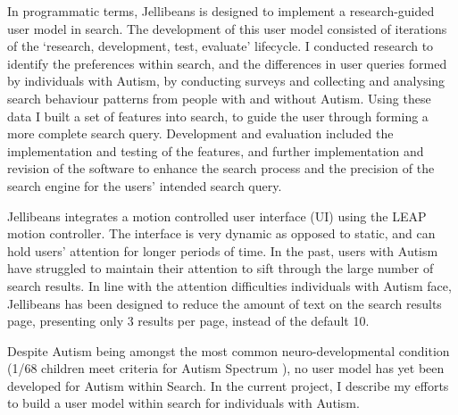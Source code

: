 \documentclass[a4paper, 11pt]{article}
\begin{document}
In programmatic terms, Jellibeans is designed to implement a research-guided user model in search. The development of this user model consisted of iterations of the `research, development, test, evaluate' lifecycle. I conducted research to identify the preferences within search, and the differences in user queries formed by individuals with Autism, by conducting surveys and collecting and analysing search behaviour patterns from people with and without Autism. Using these data I built a set of features into search, to guide the user through forming a more complete search query. Development and evaluation included the implementation and testing of the features, and further implementation and revision of the software to enhance the search process and the precision of the search engine for the users' intended search query. 
\vspace{5mm}

Jellibeans integrates a motion controlled user interface (UI) using the LEAP motion controller. The interface is very dynamic as opposed to static, and can hold users' attention for longer periods of time. In the past, users with Autism have struggled to maintain their attention to sift through the large number of search results. In line with the attention difficulties individuals with Autism face, Jellibeans has been designed to reduce the amount of text on the search results page, presenting only 3 results per page, instead of the default 10. 

\vspace{5mm}
Despite Autism being amongst the most common neuro-developmental condition (1/68 children meet criteria for Autism Spectrum \cite{CDC}), no user model has yet been developed for Autism within Search. In the current project, I describe my efforts to build a user model within search for individuals with Autism.

\end{document}

